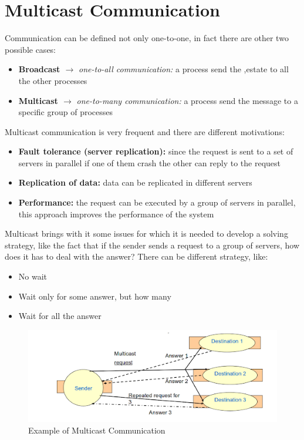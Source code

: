 \chapter{Multicast Communication}
Communication can be defined not only one-to-one, in fact there are other two possible cases:
\begin{itemize}
    \item \textbf{Broadcast \(\rightarrow\)} \textit{one-to-all communication:} a process send the ,estate to all the other processes
    \item \textbf{Multicast \(\rightarrow\)} \textit{one-to-many communication:} a process send the message to a specific group of processes
\end{itemize}
Multicast communication is very frequent and there are different motivations:
\begin{itemize}
    \item \textbf{Fault tolerance (server replication):} since the request is sent to a set of servers in parallel if one of them crash the other can reply to the request
    \item \textbf{Replication of data:}  data can be replicated in different servers
    \item \textbf{Performance:} the request can be executed by a group of servers in parallel, this approach improves the performance of the system
\end{itemize}
Multicast brings with it some issues for which it is needed to develop a solving strategy, like the fact that if  the sender sends a request to a group of servers, how does it has to deal with the answer? There can be different strategy, like:
\begin{itemize}
    \item No wait
    \item Wait only for some answer, but how many
    \item Wait for all the answer
\end{itemize}

\begin{figure}[!h]
    \centering
    \includegraphics[width=.7\linewidth]{images/multicastCommunication/multicastcomm.png}
    \caption{Example of Multicast Communication}
\end{figure}


